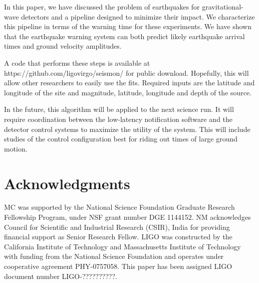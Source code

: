 \documentclass[reprint, prl, aps, showpacs]{revtex4-1}
\begin{document}
In this paper, we have discussed the problem of earthquakes for gravitational-wave detectors and a pipeline designed to minimize their impact. 
We characterize this pipeline in terms of the warning time for these experiments.
We have shown that the earthquake warning system can both predict likely earthquake arrival times and ground velocity amplitudes. 

A code that performs these steps is available at https://github.com/ligovirgo/seismon/ for public download. Hopefully, this will allow other researchers to easily use the fits. Required inputs are the latitude and longitude of the site and magnitude, latitude, longitude and depth of the source.

In the future, this algorithm will be applied to the next science run. It will require coordination between the low-latency notification software and the detector control systems to maximize the utility of the system. This will include studies of the control configuration best for riding out times of large ground motion.

\section{Acknowledgments}
MC was supported by the National Science Foundation Graduate Research Fellowship
Program, under NSF grant number DGE 1144152. 
NM acknowledges Council for Scientific and Industrial Research (CSIR), India for providing financial support as Senior Research Fellow.  
LIGO was constructed by the California Institute of Technology and Massachusetts Institute of Technology with funding from the National Science Foundation and operates under cooperative agreement PHY-0757058.
This paper has been assigned LIGO document number LIGO-??????????.



\end{document}

